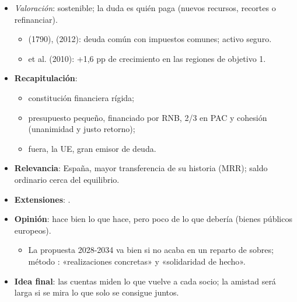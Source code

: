 \documentclass{article}
\begin{document}
\begin{columnas}
\begin{itemize}
\begin{itemize}
  \item $D_0\approx421{.}000$ M€, $i=3{,}3$\,\%, $\gamma=3{,}5$\,\%: 27.500~M€ (0,14\,\% RNB) en 2028 $\to$ 0,03\,\% en 2058.
  \end{itemize}
\item \emph{Valoración}: sostenible; la duda es quién paga (nuevos recursos, recortes o refinanciar).
  \begin{itemize}
  \item {} (1790),  (2012): deuda común con impuestos comunes; activo seguro.
  \item {} et al. (2010): +1,6 pp de crecimiento en las regiones de objetivo 1.
  \end{itemize}
\end{itemize}

\begin{itemize}
\item \textbf{Recapitulación}:
  \begin{itemize}
  \item constitución financiera rígida;
  \item presupuesto pequeño, financiado por RNB, 2/3 en PAC y cohesión (unanimidad y justo retorno);
  \item fuera, la UE, gran emisor de deuda.
  \end{itemize}
\item \textbf{Relevancia}: España, mayor transferencia de su historia (MRR); saldo ordinario cerca del equilibrio.
\item \textbf{Extensiones}:     .
\item \textbf{Opinión}: hace bien lo que hace, pero poco de lo que debería (bienes públicos europeos).
  \begin{itemize}
  \item La propuesta 2028-2034 va bien si no acaba en un reparto de sobres; método : «realizaciones concretas» y «solidaridad de hecho».
  \end{itemize}
\item \textbf{Idea final}: las cuentas miden lo que vuelve a cada socio; la amistad será larga si se mira lo que solo se consigue juntos.
\end{itemize}


\end{columnas}
\end{document}
